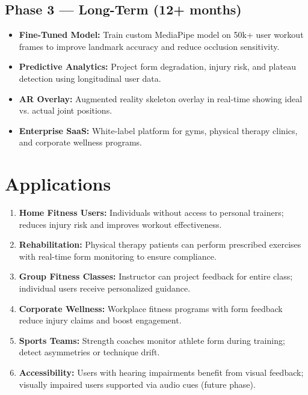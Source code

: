 \documentclass[12pt,a4paper]{article}
\begin{document}
\subsection{Phase 3 --- Long-Term (12+ months)}

\begin{itemize}[noitemsep, topsep=2pt]
  \item \textbf{Fine-Tuned Model:} Train custom MediaPipe model on 50k+ user 
        workout frames to improve landmark accuracy and reduce occlusion 
        sensitivity.
  
  \item \textbf{Predictive Analytics:} Project form degradation, injury risk, 
        and plateau detection using longitudinal user data.
  
  \item \textbf{AR Overlay:} Augmented reality skeleton overlay in real-time 
        showing ideal vs. actual joint positions.
  
  \item \textbf{Enterprise SaaS:} White-label platform for gyms, physical 
        therapy clinics, and corporate wellness programs.
\end{itemize}

\section{Applications}

\begin{enumerate}[noitemsep, topsep=2pt]
  \item \textbf{Home Fitness Users:} Individuals without access to personal 
        trainers; reduces injury risk and improves workout effectiveness.
  
  \item \textbf{Rehabilitation:} Physical therapy patients can perform prescribed 
        exercises with real-time form monitoring to ensure compliance.
  
  \item \textbf{Group Fitness Classes:} Instructor can project feedback for 
        entire class; individual users receive personalized guidance.
  
  \item \textbf{Corporate Wellness:} Workplace fitness programs with form 
        feedback reduce injury claims and boost engagement.
  
  \item \textbf{Sports Teams:} Strength coaches monitor athlete form during 
        training; detect asymmetries or technique drift.
  
  \item \textbf{Accessibility:} Users with hearing impairments benefit from 
        visual feedback; visually impaired users supported via audio cues 
        (future phase).
\end{enumerate}
\end{document}
